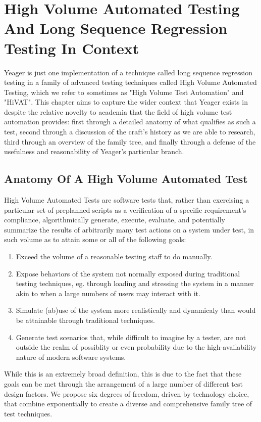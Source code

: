 \chapter{High Volume Automated Testing And Long Sequence Regression Testing In Context}
Yeager is just one implementation of a technique called long sequence regression testing in a family of advanced testing techniques called High Volume Automated Testing, which we refer to sometimes as "High Volume Test Automation" and "HiVAT". This chapter aims to capture the wider context that Yeager exists in despite the relative novelty to academia that the field of high volume test automation provides: first through a detailed anatomy of what qualifies as such a test, second through a discussion of the craft's history as we are able to research, third through an overview of the family tree, and finally through a defense of the usefulness and reasonability of Yeager's particular branch.

\section{Anatomy Of A High Volume Automated Test}
High Volume Automated Tests are software tests that, rather than exercising a particular set of preplanned scripts as a verification of a specific requirement's compliance, algorithmically generate, execute, evaluate, and potentially summarize the results of arbitrarily many test actions on a system under test, in such volume as to attain some or all of the following goals:
\begin{enumerate}
\item Exceed the volume of a reasonable testing staff to do manually.
\item Expose behaviors of the system not normally exposed during traditional testing techniques, eg. through loading and stressing the system in a manner akin to when a large numbers of users may interact with it.
\item Simulate (ab)use of the system more realistically and dynamicaly than would be attainable through traditional techniques.
\item Generate test scenarios that, while difficult to imagine by a tester, are not outside the realm of possiblity or even probability due to the high-availability nature of modern software systems.
\end{enumerate}

While this is an extremely broad definition, this is due to the fact that these goals can be met through the arrangement of a large number of different test design factors. We propose six degrees of freedom, driven by technology choice, that combine exponentially to create a diverse and comprehensive family tree of test techniques.

